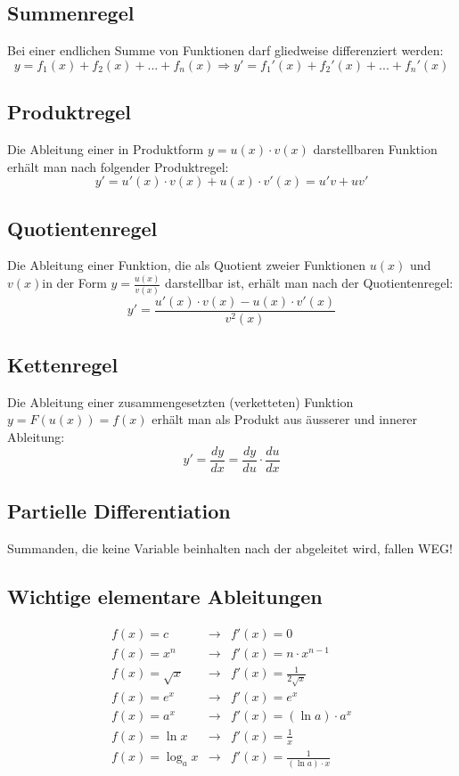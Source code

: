 \documentclass[10pt,a4paper,twocolumn]{article}
\begin{document}
\subsection{Summenregel}
Bei einer endlichen Summe von Funktionen darf gliedweise differenziert werden:
\[
y=f_1(x)+f_2(x)+...+f_n(x)\Rightarrow y'=f_1'(x)+f_2'(x)+...+f_n'(x)
\]

\subsection{Produktregel}
Die Ableitung einer in Produktform $y=u(x)\cdot v(x)$ darstellbaren Funktion erhält man nach folgender Produktregel:
\[
y'=u'(x)\cdot v(x)+u(x)\cdot v'(x)=u'v+uv'
\]

\subsection{Quotientenregel}
Die Ableitung einer Funktion, die als Quotient zweier Funktionen $u(x)$ und $v(x)$in der Form $y=\frac{u(x)}{v(x)}$ darstellbar ist, erhält man nach der Quotientenregel:
\[
y'=\frac{u'(x)\cdot v(x)-u(x)\cdot v'(x)}{v^2(x)}
\]

\subsection{Kettenregel}
Die Ableitung einer zusammengesetzten (verketteten) Funktion $y=F(u(x))=f(x)$ erhält man als Produkt aus äusserer und innerer Ableitung:
\[
y'=\frac{dy}{dx}=\frac{dy}{du}\cdot \frac{du}{dx}
\]

\subsection{Partielle Differentiation}
Summanden, die keine Variable beinhalten nach der abgeleitet wird, fallen WEG!

\subsection{Wichtige elementare Ableitungen}
\[
\begin{array}{lll}
	f(x)=c & \rightarrow & f'(x)=0 \\
	f(x)=x^n & \rightarrow & f'(x)=n\cdot x^{n-1} \\	
	f(x)=\sqrt{x}& \rightarrow & f'(x)=\frac{1}{2\sqrt{x}} \\
	f(x)=e^x & \rightarrow & f'(x)=e^x \\
	f(x)=a^x & \rightarrow & f'(x)=(\ln a)\cdot a^x \\
	f(x)=\ln x & \rightarrow & f'(x)=\frac{1}{x} \\
	f(x)=\log_{a}x & \rightarrow & f'(x)=\frac{1}{(\ln a)\cdot x} \\
\end{array}
\]
\end{document}
